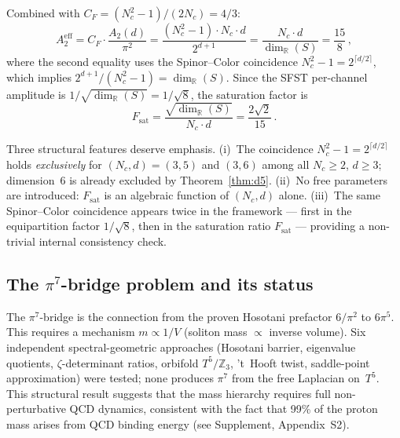 \documentclass[11pt,a4paper]{article}
\theoremstyle{definition}
\theoremstyle{remark}
\begin{document}
Combined with $C_F=(N_c^2-1)/(2N_c)=4/3$:
\begin{equation}
  A_2^{\mathrm{eff}}
  = C_F\cdot\frac{A_2(d)}{\pi^2}
  = \frac{(N_c^2-1)\cdot N_c\cdot d}{2^{d+1}}
  = \frac{N_c\cdot d}{\dim_\mathbb{R}(S)}
  = \frac{15}{8}\,,
\end{equation}
where the second equality uses the Spinor--Color coincidence
$N_c^2-1=2^{\lceil d/2\rceil}$, which implies
$2^{d+1}/(N_c^2-1)=\dim_\mathbb{R}(S)$.  Since the SFST
per-channel amplitude is $1/\sqrt{\dim_\mathbb{R}(S)}=1/\sqrt{8}$, the
saturation factor is
\begin{equation}\label{eq:Fsat}
  F_{\mathrm{sat}}
  = \frac{\sqrt{\dim_\mathbb{R}(S)}}{N_c\cdot d}
  = \frac{2\sqrt{2}}{15}\,.
\end{equation}

Three structural features deserve emphasis.
(i)~The coincidence $N_c^2-1=2^{\lceil d/2\rceil}$ holds
\emph{exclusively} for $(N_c,d)=(3,5)$ and $(3,6)$ among all $N_c\geq 2$,
$d\geq 3$; dimension~6 is already excluded by Theorem~\ref{thm:d5}.
(ii)~No free parameters are introduced: $F_{\mathrm{sat}}$ is
an algebraic function of $(N_c,d)$ alone.
(iii)~The same Spinor--Color coincidence appears twice in the framework
--- first in the equipartition factor $1/\sqrt{8}$, then in the
saturation ratio $F_{\mathrm{sat}}$ --- providing a non-trivial
internal consistency check.

\subsection{The $\pi^7$-bridge problem and its status}

The $\pi^7$-bridge is the connection from the proven Hosotani
prefactor $6/\pi^2$ to $6\pi^5$.  This requires a
mechanism $m\propto 1/V$ (soliton mass $\propto$ inverse volume).  Six
independent spectral-geometric approaches (Hosotani barrier, eigenvalue
quotients, $\zeta$-determinant ratios, orbifold $T^5/\mathbb{Z}_3$,
't~Hooft twist, saddle-point approximation) were tested; none produces
$\pi^7$ from the free Laplacian on~$T^5$.  This structural result
suggests that the mass hierarchy requires full non-perturbative QCD
dynamics, consistent with the fact that 99\% of the proton mass arises
from QCD binding energy (see Supplement, Appendix~S2).
\end{document}
